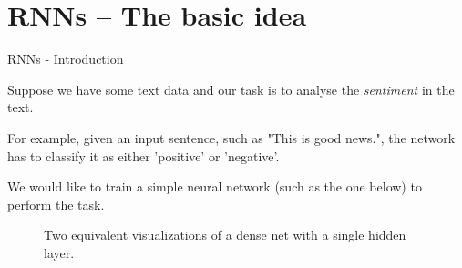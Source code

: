 \documentclass[11pt,compress,t,notes=noshow]{beamer}
\begin{document}
\section{RNNs -- The basic idea}

\begin{frame} {RNNs - Introduction}
  \begin{itemize}
    \item \small{Suppose we have some text data and our task is to analyse the \textit{sentiment} in the text.
    \item For example, given an input sentence, such as "This is good news.", the network has to classify it as either 'positive' or 'negative'.
    \item We would like to train a simple neural network (such as the one below) to perform the task.}
  \end{itemize}
  \begin{figure}
      \centering
      \caption{\footnotesize{Two equivalent visualizations of a dense net with a single hidden layer.}}
  \end{figure}
\end{frame}
\end{document}
